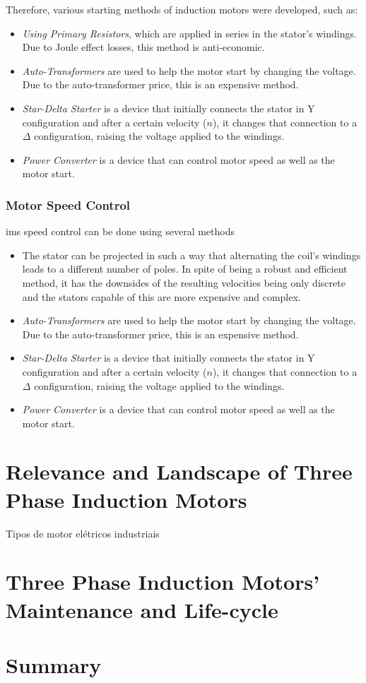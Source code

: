 Therefore, various starting methods of induction motors were developed, such as:

\begin{itemize}
  \item 
  \emph{Using Primary Resistors}, which are applied in series in the stator's windings. Due to Joule effect losses, this method is anti-economic.
  \item 
  \emph{Auto-Transformers} are used to help the motor start by changing the voltage. Due to the auto-transformer price, this is an expensive method.
  \item 
  \emph{Star-Delta Starter} is a device that initially connects the stator in Y configuration and after a certain velocity ($n$), it changes that connection to a $\Delta$ configuration, raising the voltage applied to the windings.
  \item 
  \emph{Power Converter} is a device that can control motor speed as well as the motor start.
\end{itemize}

\subsubsection{Motor Speed Control}
\acrshort{ims} speed control can be done using several methods

\begin{itemize}
  \item 
  The stator can be projected in such a way that alternating the coil's windings leads to a different number of poles. In spite of being a robust and efficient method, it has the downsides of the resulting velocities being only discrete and the stators capable of this are more expensive and complex. 
  \item 
  \emph{Auto-Transformers} are used to help the motor start by changing the voltage. Due to the auto-transformer price, this is an expensive method.
  \item 
  \emph{Star-Delta Starter} is a device that initially connects the stator in Y configuration and after a certain velocity ($n$), it changes that connection to a $\Delta$ configuration, raising the voltage applied to the windings.
  \item 
  \emph{Power Converter} is a device that can control motor speed as well as the motor start.
\end{itemize}

\section{Relevance and Landscape of Three Phase Induction Motors} %
\label{sec:tpin_relevance}
Tipos de motor elétricos industriais ~\cite{Ferreira1}


\section{Three Phase Induction Motors' Maintenance and Life-cycle} %
\label{sec:Three_phase_induction_motors_maintenance_and_lyfe_cycle}

\section{Summary} %
\label{sec:tpem_summary}

